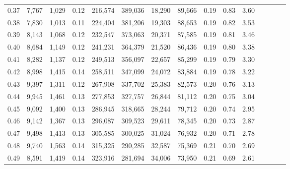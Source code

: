 \begin{tabular}{rrrcrrrrrrrrrrr}
0.37 &   7,767 &  1,029 &                                       0.12 &  216,574 &  389,036 &   18,290 &   89,666 &  0.19 &  0.83 &                         3.60 \\
0.38 &   7,830 &  1,013 &                                       0.11 &  224,404 &  381,206 &   19,303 &   88,653 &  0.19 &  0.82 &                         3.53 \\
0.39 &   8,143 &  1,068 &                                       0.12 &  232,547 &  373,063 &   20,371 &   87,585 &  0.19 &  0.81 &                         3.46 \\
0.40 &   8,684 &  1,149 &                                       0.12 &  241,231 &  364,379 &   21,520 &   86,436 &  0.19 &  0.80 &                         3.38 \\
0.41 &   8,282 &  1,137 &                                       0.12 &  249,513 &  356,097 &   22,657 &   85,299 &  0.19 &  0.79 &                         3.30 \\
0.42 &   8,998 &  1,415 &                                       0.14 &  258,511 &  347,099 &   24,072 &   83,884 &  0.19 &  0.78 &                         3.22 \\
0.43 &   9,397 &  1,311 &                                       0.12 &  267,908 &  337,702 &   25,383 &   82,573 &  0.20 &  0.76 &                         3.13 \\
0.44 &   9,945 &  1,461 &                                       0.13 &  277,853 &  327,757 &   26,844 &   81,112 &  0.20 &  0.75 &                         3.04 \\
0.45 &   9,092 &  1,400 &                                       0.13 &  286,945 &  318,665 &   28,244 &   79,712 &  0.20 &  0.74 &                         2.95 \\
0.46 &   9,142 &  1,367 &                                       0.13 &  296,087 &  309,523 &   29,611 &   78,345 &  0.20 &  0.73 &                         2.87 \\
0.47 &   9,498 &  1,413 &                                       0.13 &  305,585 &  300,025 &   31,024 &   76,932 &  0.20 &  0.71 &                         2.78 \\
0.48 &   9,740 &  1,563 &                                       0.14 &  315,325 &  290,285 &   32,587 &   75,369 &  0.21 &  0.70 &                         2.69 \\
0.49 &   8,591 &  1,419 &                                       0.14 &  323,916 &  281,694 &   34,006 &   73,950 &  0.21 &  0.69 &                         2.61 \\

\end{tabular}

